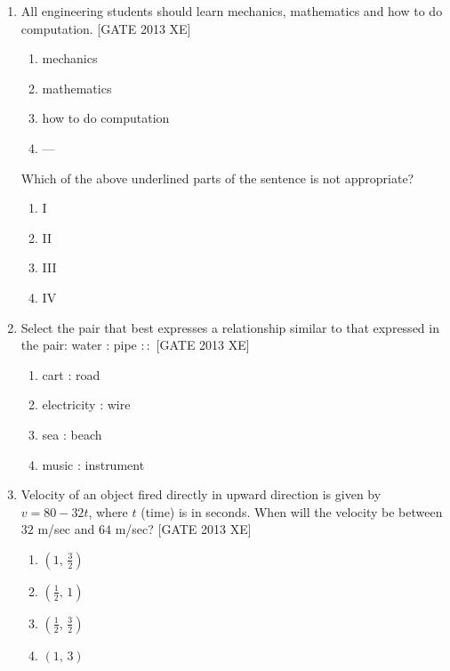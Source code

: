 \documentclass[journal,12pt,onecolumn]{IEEEtran}
\theoremstyle{remark}
\begin{document}
\begin{enumerate}
    \item All engineering students should learn mechanics, mathematics and how to do computation. \hfill[GATE 2013 XE]
    \begin{multicols}{2}
    \begin{enumerate}
        \item mechanics
        \item mathematics
        \item how to do computation
        \item ---
    \end{enumerate}
    \end{multicols}
    Which of the above underlined parts of the sentence is not appropriate?
    \begin{multicols}{2}
    \begin{enumerate}
        \item I
        \item II
        \item III
        \item IV
    \end{enumerate}
    \end{multicols}

    \item Select the pair that best expresses a relationship similar to that expressed in the pair:  
    water : pipe $::$ \hfill[GATE 2013 XE]
    \begin{multicols}{2}
    \begin{enumerate}
        \item cart : road
        \item electricity : wire
        \item sea : beach
        \item music : instrument
    \end{enumerate}
    \end{multicols}
 \item Velocity of an object fired directly in upward direction is given by $v = 80 - 32t$, where $t$ (time) is in seconds. When will the velocity be between $32$ m/sec and $64$ m/sec? \hfill[GATE 2013 XE]
    \begin{multicols}{2}
    \begin{enumerate}
        \item $(1,\,\frac{3}{2})$
        \item $(\frac{1}{2},\,1)$
        \item $(\frac{1}{2},\,\frac{3}{2})$
        \item $(1,\,3)$
    \end{enumerate}
    \end{multicols}


\end{enumerate}
\end{document}

